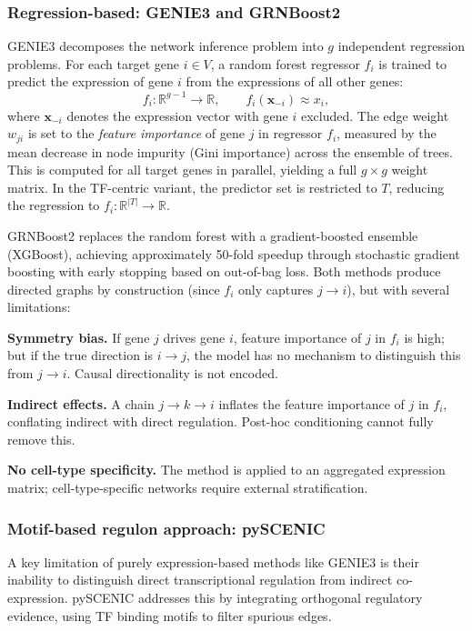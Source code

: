 \subsubsection{Regression-based: GENIE3 and GRNBoost2}
GENIE3 \cite{genie3} decomposes the network inference problem into \(g\) independent regression
problems. For each target gene \(i \in V\), a random forest regressor \(f_i\) is trained to predict
the expression of gene \(i\) from the expressions of all other genes:
\begin{equation}
  f_i : \mathbb{R}^{g-1} \to \mathbb{R}, \qquad
  f_i\!\left( \mathbf{x}_{-i} \right) \approx x_i,
\end{equation}
where \(\mathbf{x}_{-i}\) denotes the expression vector with gene \(i\) excluded. The edge weight
\(w_{ji}\) is set to the \emph{feature importance} of gene \(j\) in regressor \(f_i\), measured by
the mean decrease in node impurity (Gini importance) across the ensemble of trees. This is
computed for all target genes in parallel, yielding a full \(g \times g\) weight matrix. In the
\gls{TF}-centric variant, the predictor set is restricted to \(T\), reducing the regression to
\(f_i : \mathbb{R}^{|T|} \to \mathbb{R}\).

GRNBoost2 replaces the random forest with a gradient-boosted ensemble (XGBoost), achieving
approximately 50-fold speedup through stochastic gradient boosting with early stopping based on
out-of-bag loss. Both methods produce directed graphs by construction (since \(f_i\) only captures
\(j \to i\)), but with several limitations:

\textbf{Symmetry bias.} If gene \(j\) drives gene \(i\), feature importance of \(j\) in \(f_i\) is high; but if the true direction is \(i \to j\), the model has no mechanism to distinguish this from \(j \to i\). Causal directionality is not encoded.

\textbf{Indirect effects.} A chain \(j \to k \to i\) inflates the feature importance of \(j\) in \(f_i\), conflating indirect with direct regulation. Post-hoc conditioning cannot fully remove this.

\textbf{No cell-type specificity.} The method is applied to an aggregated expression matrix; cell-type-specific networks require external stratification.

\subsubsection{Motif-based regulon approach: pySCENIC}
A key limitation of purely expression-based methods like GENIE3 is their inability to distinguish
direct transcriptional regulation from indirect co-expression. pySCENIC addresses this by
integrating orthogonal regulatory evidence, using \gls{TF} binding motifs to filter spurious edges.

